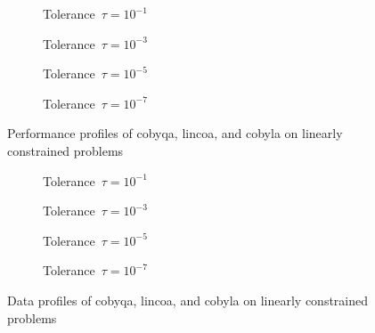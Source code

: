 \begin{figure}[ht]
    \centering
    \begin{subfigure}[b]{0.49\textwidth}
        \centering
        \caption{Tolerance~$\tau = 10^{-1}$}
    \end{subfigure}
    \hfill
    \begin{subfigure}[b]{0.49\textwidth}
        \centering
        \caption{Tolerance~$\tau = 10^{-3}$}
    \end{subfigure}
    \begin{subfigure}[b]{0.49\textwidth}
        \centering
        \caption{Tolerance~$\tau = 10^{-5}$}
    \end{subfigure}
    \hfill
    \begin{subfigure}[b]{0.49\textwidth}
        \centering
        \caption{Tolerance~$\tau = 10^{-7}$}
    \end{subfigure}
    \caption[Performance profiles on linearly constrained problems]{Performance profiles of \gls{cobyqa}, \gls{lincoa}, and \gls{cobyla} on linearly constrained problems}
    \label{fig:perf-linearly-constrained-problems}
\end{figure}

\begin{figure}[ht]
    \centering
    \begin{subfigure}[b]{0.49\textwidth}
        \centering
        \caption{Tolerance~$\tau = 10^{-1}$}
    \end{subfigure}
    \hfill
    \begin{subfigure}[b]{0.49\textwidth}
        \centering
        \caption{Tolerance~$\tau = 10^{-3}$}
    \end{subfigure}
    \begin{subfigure}[b]{0.49\textwidth}
        \centering
        \caption{Tolerance~$\tau = 10^{-5}$}
    \end{subfigure}
    \hfill
    \begin{subfigure}[b]{0.49\textwidth}
        \centering
        \caption{Tolerance~$\tau = 10^{-7}$}
    \end{subfigure}
    \caption[Data profiles on linearly constrained problems]{Data profiles of \gls{cobyqa}, \gls{lincoa}, and \gls{cobyla} on linearly constrained problems}
    \label{fig:data-linearly-constrained-problems}
\end{figure}

